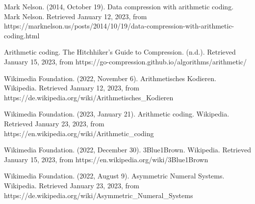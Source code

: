 \documentclass[a4paper]{article}
\theoremstyle{definition}
\theoremstyle{remark}
\begin{document}
	\begin{thebibliography}{2}
		 Mark Nelson. (2014, October 19). Data compression with arithmetic coding. Mark Nelson. Retrieved January 12, 2023, from https://marknelson.us/posts/2014/10/19/data-compression-with-arithmetic-coding.html 

 Arithmetic coding. The Hitchhiker's Guide to Compression. (n.d.). Retrieved January 15, 2023, from https://go-compression.github.io/algorithms/arithmetic/ 
		
		 Wikimedia Foundation. (2022, November 6). Arithmetisches Kodieren. Wikipedia. Retrieved January 12, 2023, from https://de.wikipedia.org/wiki/Arithmetisches\_Kodieren
		
		 Wikimedia Foundation. (2023, January 21). Arithmetic coding. Wikipedia. Retrieved January 23, 2023, from https://en.wikipedia.org/wiki/Arithmetic\_coding
	
		 Wikimedia Foundation. (2022, December 30). 3Blue1Brown. Wikipedia. Retrieved January 15, 2023, from https://en.wikipedia.org/wiki/3Blue1Brown 
	
		 Wikimedia Foundation. (2022, August 9). Asymmetric Numeral Systems. Wikipedia. Retrieved January 23, 2023, from https://de.wikipedia.org/wiki/Asymmetric\_Numeral\_Systems	
			\end{thebibliography}
\end{document}
